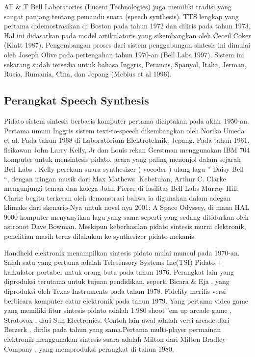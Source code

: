 AT \& T Bell Laboratories (Lucent Technologies) juga memiliki tradisi yang sangat panjang tentang pemandu suara (speech synthesis). TTS lengkap yang pertama didemostrasikan di Boston pada tahun 1972 dan diliris pada tahun 1973. Hal ini didasarkan pada model artikulatoris yang sikembangkan oleh Ceceil Coker (Klatt 1987). Pengembangan proses dari sistem penggabungan sintesis ini dimulai oleh Joseph Olive pada pertengahan tahun 1970-an (Bell Labs 1997). Sistem ini sekarang sudah tersedia untuk bahasa Inggris, Perancis, Spanyol, Italia, Jerman, Rusia, Rumania, Cina, dan Jepang (Mcbius et al 1996).

\subsection{Perangkat Speech Synthesis}
Pidato sistem sintesis berbasis komputer pertama diciptakan pada akhir 1950-an. Pertama umum Inggris sistem text-to-speech dikembangkan oleh Noriko Umeda et al. Pada tahun 1968 di Laboratorium Elektroteknik, Jepang. Pada tahun 1961, fisikawan John Larry Kelly, Jr dan Louis rekan Gerstman menggunakan IBM 704 komputer untuk mensintesis pidato, acara yang paling menonjol dalam sejarah Bell Labs . Kelly perekam suara synthesizer ( vocoder ) ulang lagu ” Daisy Bell “, dengan iringan musik dari Max Mathews .Kebetulan, Arthur C. Clarke mengunjungi teman dan kolega John Pierce di fasilitas Bell Labs Murray Hill. Clarke begitu terkesan oleh demonstrasi bahwa ia digunakan dalam adegan klimaks dari skenario-Nya untuk novel nya 2001: A Space Odyssey, di mana HAL 9000 komputer menyanyikan lagu yang sama seperti yang sedang ditidurkan oleh astronot Dave Bowman. Meskipun keberhasilan pidato sintesis murni elektronik, penelitian masih terus dilakukan ke synthesizer pidato mekanis.

Handheld elektronik menampilkan sintesis pidato mulai muncul pada 1970-an. Salah satu yang pertama adalah Telesensory Systems Inc(TSI) Pidato + kalkulator portabel untuk orang buta pada tahun 1976. Perangkat lain yang diproduksi terutama untuk tujuan pendidikan, seperti Bicara \& Eja , yang diproduksi oleh Texas Instruments pada tahun 1978. Fidelity merilis versi berbicara komputer catur elektronik pada tahun 1979. Yang pertama video game yang memiliki fitur sintesis pidato adalah 1.980 shoot ’em up arcade game , Stratovox , dari Sun Electronics. Contoh lain awal adalah versi arcade dari Berzerk , dirilis pada tahun yang sama.Pertama multi-player permainan elektronik menggunakan sintesis suara adalah Milton dari Milton Bradley Company , yang memproduksi perangkat di tahun 1980.

